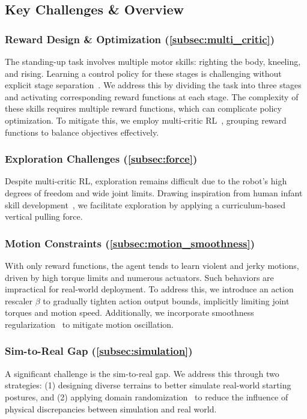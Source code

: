\subsection{Key Challenges \& Overview}\label{subsec:key_challenges}
\subsubsection{Reward Design \& Optimization (\cref{subsec:multi_critic})} The standing-up task involves multiple motor skills: righting the body, kneeling, and rising. Learning a control policy for these stages is challenging without explicit stage separation~\cite{li2023robust,kim2024stage}. We address this by dividing the task into three stages and activating corresponding reward functions at each stage. The complexity of these skills requires multiple reward functions, which can complicate policy optimization. To mitigate this, we employ multi-critic RL~\cite{mysore2022multi}, grouping reward functions to balance objectives effectively.

\subsubsection{Exploration Challenges (\cref{subsec:force})} Despite multi-critic RL, exploration remains difficult due to the robot’s high degrees of freedom and wide joint limits. Drawing inspiration from human infant skill development~\cite{claxton2012control}, we facilitate exploration by applying a curriculum-based vertical pulling force.

\subsubsection{Motion Constraints (\cref{subsec:motion_smoothness})} With only reward functions, the agent tends to learn violent and jerky motions, driven by high torque limits and numerous actuators. Such behaviors are impractical for real-world deployment. To address this, we introduce an action rescaler $\beta$ to gradually tighten action output bounds, implicitly limiting joint torques and motion speed. Additionally, we incorporate smoothness regularization~\cite{Kobayashi2022L2C2LL} to mitigate motion oscillation.

\subsubsection{Sim-to-Real Gap (\cref{subsec:simulation})} A significant challenge is the sim-to-real gap. We address this through two strategies: (1) designing diverse terrains to better simulate real-world starting postures, and (2) applying domain randomization~\cite{tobin2017domain} to reduce the influence of physical discrepancies between simulation and real world.


